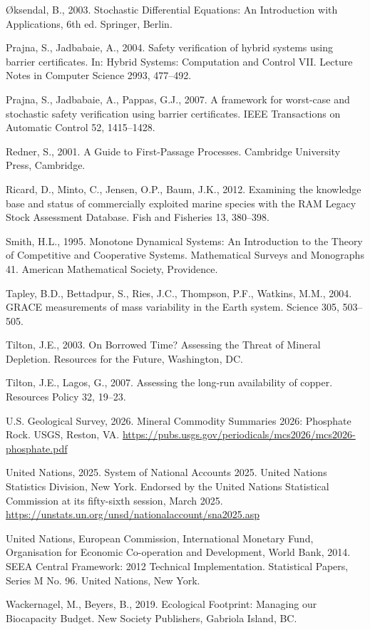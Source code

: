 \documentclass[11pt]{article}
\begin{document}
\O{}ksendal, B., 2003. Stochastic Differential Equations: An Introduction with Applications, 6th ed. Springer, Berlin.

Prajna, S., Jadbabaie, A., 2004. Safety verification of hybrid systems using barrier certificates. In: Hybrid Systems: Computation and Control VII. Lecture Notes in Computer Science 2993, 477--492.

Prajna, S., Jadbabaie, A., Pappas, G.J., 2007. A framework for worst-case and stochastic safety verification using barrier certificates. IEEE Transactions on Automatic Control 52, 1415--1428.

Redner, S., 2001. A Guide to First-Passage Processes. Cambridge University Press, Cambridge.

Ricard, D., Minto, C., Jensen, O.P., Baum, J.K., 2012. Examining the knowledge base and status of commercially exploited marine species with the RAM Legacy Stock Assessment Database. Fish and Fisheries 13, 380--398.

Smith, H.L., 1995. Monotone Dynamical Systems: An Introduction to the Theory of Competitive and Cooperative Systems. Mathematical Surveys and Monographs 41. American Mathematical Society, Providence.

Tapley, B.D., Bettadpur, S., Ries, J.C., Thompson, P.F., Watkins, M.M., 2004. GRACE measurements of mass variability in the Earth system. Science 305, 503--505.

Tilton, J.E., 2003. On Borrowed Time? Assessing the Threat of Mineral Depletion. Resources for the Future, Washington, DC.

Tilton, J.E., Lagos, G., 2007. Assessing the long-run availability of copper. Resources Policy 32, 19--23.

U.S. Geological Survey, 2026. Mineral Commodity Summaries 2026: Phosphate Rock. USGS, Reston, VA. \url{https://pubs.usgs.gov/periodicals/mcs2026/mcs2026-phosphate.pdf}

United Nations, 2025. System of National Accounts 2025. United Nations Statistics Division, New York. Endorsed by the United Nations Statistical Commission at its fifty-sixth session, March 2025. \url{https://unstats.un.org/unsd/nationalaccount/sna2025.asp}

United Nations, European Commission, International Monetary Fund, Organisation for Economic Co-operation and Development, World Bank, 2014. SEEA Central Framework: 2012 Technical Implementation. Statistical Papers, Series M No. 96. United Nations, New York.

Wackernagel, M., Beyers, B., 2019. Ecological Footprint: Managing our Biocapacity Budget. New Society Publishers, Gabriola Island, BC.
\end{document}
